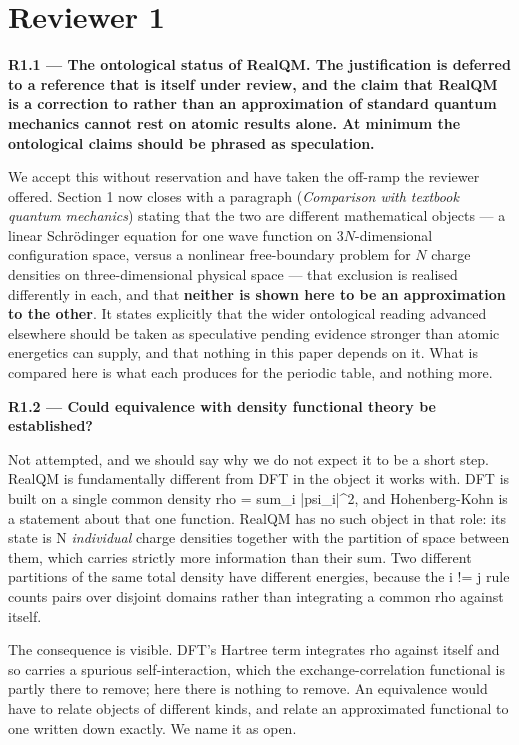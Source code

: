 \documentclass[11pt,a4paper]{article}
\begin{document}
\section*{Reviewer 1}

\textbf{R1.1 --- The ontological status of RealQM. The justification is deferred to a reference that is
itself under review, and the claim that RealQM is a correction to rather than an approximation
of standard quantum mechanics cannot rest on atomic results alone. At minimum the ontological
claims should be phrased as speculation.}

We accept this without reservation and have taken the off-ramp the reviewer offered. Section 1
now closes with a paragraph (\emph{Comparison with textbook quantum mechanics}) stating that the
two are different mathematical objects --- a linear Schrödinger equation for one wave function on
$3N$-dimensional configuration space, versus a nonlinear free-boundary problem for $N$ charge
densities on three-dimensional physical space --- that exclusion is realised differently in each,
and that \textbf{neither is shown here to be an approximation to the other}. It states explicitly
that the wider ontological reading advanced elsewhere should be taken as speculative pending
evidence stronger than atomic energetics can supply, and that nothing in this paper depends on
it. What is compared here is what each produces for the periodic table, and nothing more.

\textbf{R1.2 --- Could equivalence with density functional theory be established?}

Not attempted, and we should say why we do not expect it to be a short step. RealQM is
fundamentally different from DFT in the object it works with. DFT is built on a single common
density rho = sum\_i |psi\_i|\textasciicircum{}2, and Hohenberg-Kohn is a statement about that one function. RealQM
has no such object in that role: its state is N \emph{individual} charge densities together with the
partition of space between them, which carries strictly more information than their sum. Two
different partitions of the same total density have different energies, because the i != j rule
counts pairs over disjoint domains rather than integrating a common rho against itself.

The consequence is visible. DFT's Hartree term integrates rho against itself and so carries a
spurious self-interaction, which the exchange-correlation functional is partly there to remove;
here there is nothing to remove. An equivalence would have to relate objects of different kinds,
and relate an approximated functional to one written down exactly. We name it as open.
\end{document}
